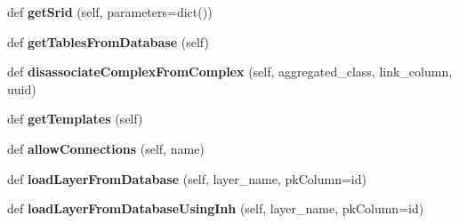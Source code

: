 \begin{DoxyCompactItemize}
def {\bfseries get\+Srid} (self, parameters=dict())
\item 
\mbox{\label{class_dsg_tools_1_1_factories_1_1_sql_factory_1_1postgis_sql_generator_1_1_post_g_i_s_sql_generator_aef0d0f7a6a3aef54e2bf5f7f37bd8a18}} 
def {\bfseries get\+Tables\+From\+Database} (self)
\item 
\mbox{\label{class_dsg_tools_1_1_factories_1_1_sql_factory_1_1postgis_sql_generator_1_1_post_g_i_s_sql_generator_a143f990aba6d9341d7ae5bef04ef1ca1}} 
def {\bfseries disassociate\+Complex\+From\+Complex} (self, aggregated\+\_\+class, link\+\_\+column, uuid)
\item 
\mbox{\label{class_dsg_tools_1_1_factories_1_1_sql_factory_1_1postgis_sql_generator_1_1_post_g_i_s_sql_generator_addf2b1c49ded7a8786a6623dc8b69bf0}} 
def {\bfseries get\+Templates} (self)
\item 
\mbox{\label{class_dsg_tools_1_1_factories_1_1_sql_factory_1_1postgis_sql_generator_1_1_post_g_i_s_sql_generator_ad1baae97fff2438b60e45e0a5a5bd15b}} 
def {\bfseries allow\+Connections} (self, name)
\item 
\mbox{\label{class_dsg_tools_1_1_factories_1_1_sql_factory_1_1postgis_sql_generator_1_1_post_g_i_s_sql_generator_aeb261e6bce597bc2080a639a1383807d}} 
def {\bfseries load\+Layer\+From\+Database} (self, layer\+\_\+name, pk\+Column=\textquotesingle{}id\textquotesingle{})
\item 
\mbox{\label{class_dsg_tools_1_1_factories_1_1_sql_factory_1_1postgis_sql_generator_1_1_post_g_i_s_sql_generator_a5ec8ca9b1dcc66ffd3fcf63145637364}} 
def {\bfseries load\+Layer\+From\+Database\+Using\+Inh} (self, layer\+\_\+name, pk\+Column=\textquotesingle{}id\textquotesingle{})

\end{DoxyCompactItemize}
